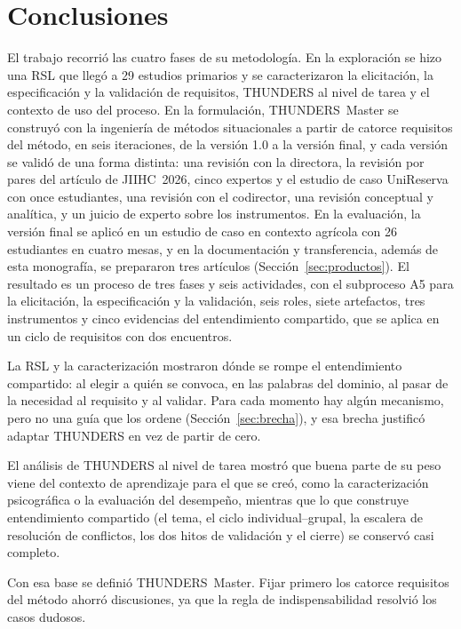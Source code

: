 \documentclass[12pt,letterpaper,oneside]{report}
\begin{document}
\section{Conclusiones}
El trabajo recorrió las cuatro fases de su metodología. En la exploración se hizo
una RSL que llegó a 29 estudios primarios y se caracterizaron la elicitación, la
especificación y la validación de requisitos, THUNDERS al nivel de tarea y el
contexto de uso del proceso. En la formulación, THUNDERS~Master se construyó con
la ingeniería de métodos situacionales a partir de catorce requisitos del
método, en seis iteraciones, de la versión 1.0 a la versión final, y cada
versión se validó de una forma distinta: una revisión con la directora, la
revisión por pares del artículo de JIIHC~2026, cinco expertos y el estudio de
caso UniReserva con once estudiantes, una revisión con el codirector, una
revisión conceptual y analítica, y un juicio de experto sobre los instrumentos.
En la evaluación, la versión final se aplicó en un estudio de caso en contexto
agrícola con 26 estudiantes en cuatro mesas, y en la documentación y
transferencia, además de esta monografía, se prepararon tres artículos
(Sección~\ref{sec:productos}). El resultado es un proceso de tres fases y seis
actividades, con el subproceso A5 para la elicitación, la especificación y la
validación, seis roles, siete artefactos, tres instrumentos y cinco evidencias
del entendimiento compartido, que se aplica en un ciclo de requisitos con dos
encuentros.

La RSL y la caracterización mostraron dónde se rompe el
entendimiento compartido: al elegir a quién se convoca, en las palabras del
dominio, al pasar de la necesidad al requisito y al validar. Para cada momento hay algún mecanismo, pero no una guía que los ordene (Sección~\ref{sec:brecha}),
y esa brecha justificó adaptar THUNDERS en vez de partir de cero.

El análisis de THUNDERS al nivel de tarea mostró que buena parte
de su peso viene del contexto de aprendizaje para el que se creó, como la
caracterización psicográfica o la evaluación del desempeño, mientras que lo que
construye entendimiento compartido (el tema, el ciclo individual--grupal, la escalera de
resolución de conflictos, los dos hitos de validación y el cierre) se conservó casi completo.

Con esa base se definió THUNDERS~Master. Fijar primero los catorce requisitos
del método ahorró discusiones, ya que la regla de indispensabilidad resolvió los
casos dudosos.
\end{document}
